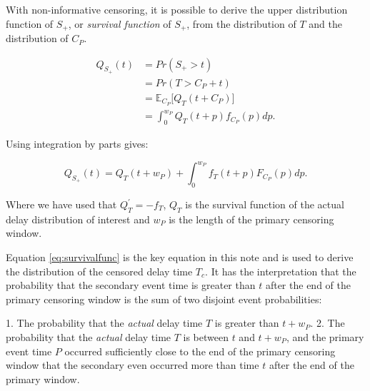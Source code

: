 \documentclass[10pt,letterpaper]{article}
\begin{document}
With non-informative censoring, it is possible to derive the upper distribution function of $S_+$, or \textit{survival function} of $S_+$, from the distribution of $T$ and the distribution of $C_P$.


\begin{equation}
\begin{split}
Q_{S_+}(t) &= Pr(S_+ > t) \\
&= Pr(T > C_P + t) \\
&= \mathbb{E}_{C_P} \Big[Q_T(t + C_P)\Big] \\
&= \int_0^{w_P} Q_T(t + p) f_{C_P}(p) dp.
\end{split}
\end{equation}


Using integration by parts gives:

\begin{equation}
\label{eq:survivalfunc}
Q_{S_+}(t) = Q_T(t + w_P) + \int_0^{w_P} f_T(t+p) F_{C_P}(p) dp.
\end{equation}

Where we have used that $Q^{'}_{T} = - f_T$, $Q_T$ is the survival function of the actual delay distribution of interest and $w_P$ is the length of the primary censoring window.

Equation \ref{eq:survivalfunc} is the key equation in this note and is used to derive the distribution of the censored delay time $T_c$. It has the interpretation that the probability that the secondary event time is greater than $t$ after the end of the primary censoring window is the sum of two disjoint event probabilities:

1. The probability that the \textit{actual} delay time $T$ is greater than $t + w_P$.
2. The probability that the \textit{actual} delay time $T$ is between $t$ and $t + w_P$, and the primary event time $P$ occurred sufficiently close to the end of the primary censoring window that the secondary even occurred more than time $t$ after the end of the primary window.

\end{document}
